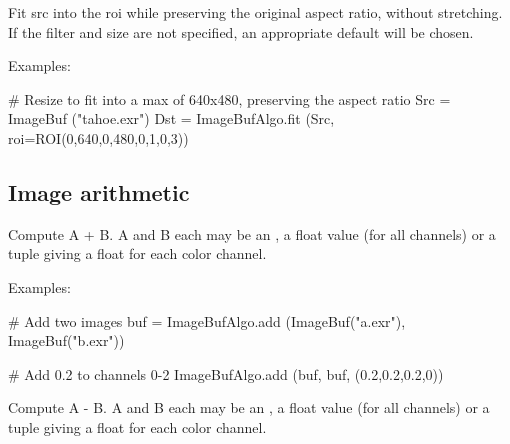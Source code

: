  
Fit {\cf src} into the {\cf roi} while preserving the
original aspect ratio, without stretching.  If the filter and size are not
specified, an appropriate default will be chosen.

\smallskip
\noindent Examples:
\begin{code}
    # Resize to fit into a max of 640x480, preserving the aspect ratio
    Src = ImageBuf ("tahoe.exr")
    Dst = ImageBufAlgo.fit (Src, roi=ROI(0,640,0,480,0,1,0,3))
\end{code}
\apiend



\subsection{Image arithmetic}
\label{sec:iba:py:arith}

 

Compute {\cf A + B}.  {\cf A} and {\cf B} each may
be an \ImageBuf, a {\cf float} value (for all channels) or a tuple giving a
{\cf float} for each color channel.

\smallskip
\noindent Examples:
\begin{code}
    # Add two images
    buf = ImageBufAlgo.add (ImageBuf("a.exr"), ImageBuf("b.exr"))

    # Add 0.2 to channels 0-2 
    ImageBufAlgo.add (buf, buf, (0.2,0.2,0.2,0))
\end{code}
\apiend


 

Compute {\cf A - B}.  {\cf A} and {\cf B} each may
be an \ImageBuf, a {\cf float} value (for all channels) or a tuple giving a
{\cf float} for each color channel.

